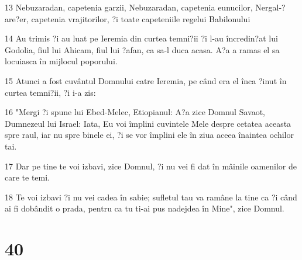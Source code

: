 \par 13 Nebuzaradan, capetenia garzii, Nebuzaradan, capetenia eunucilor, Nergal-?are?er, capetenia vrajitorilor, ?i toate capeteniile regelui Babilonului
\par 14 Au trimis ?i au luat pe Ieremia din curtea temni?ii ?i l-au încredin?at lui Godolia, fiul lui Ahicam, fiul lui ?afan, ca sa-l duca acasa. A?a a ramas el sa locuiasca în mijlocul poporului.
\par 15 Atunci a fost cuvântul Domnului catre Ieremia, pe când era el înca ?inut în curtea temni?ii, ?i i-a zis:
\par 16 "Mergi ?i spune lui Ebed-Melec, Etiopianul: A?a zice Domnul Savaot, Dumnezeul lui Israel: Iata, Eu voi împlini cuvintele Mele despre cetatea aceasta spre raul, iar nu spre binele ei, ?i se vor împlini ele în ziua aceea înaintea ochilor tai.
\par 17 Dar pe tine te voi izbavi, zice Domnul, ?i nu vei fi dat în mâinile oamenilor de care te temi.
\par 18 Te voi izbavi ?i nu vei cadea în sabie; sufletul tau va ramâne la tine ca ?i când ai fi dobândit o prada, pentru ca tu ti-ai pus nadejdea în Mine", zice Domnul.

\chapter{40}

